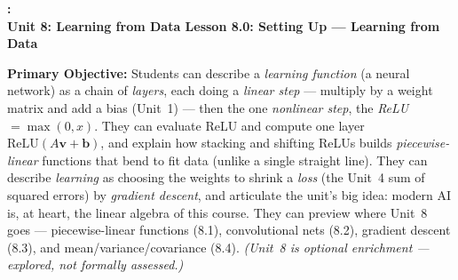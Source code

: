 \documentclass[10pt]{article}
\newcommand{\vv}{\mathbf{v}}
\newcommand{\bb}{\mathbf{b}}
\newcommand{\relu}{\mathrm{ReLU}}
\newcommand{\UnitNumberName}{Unit 8: Learning from Data \quad}
\newcommand{\LessonNumberName}{Lesson 8.0: Setting Up --- Learning from Data}
\begin{document}
\begin{center}
    {\Large\bfseries \CourseName: \SchoolYear \\
    {\small\bfseries \UnitNumberName \LessonNumberName}}
\end{center}

\begin{tcolorbox}[colback=blush, colframe=burgundy, boxrule=0.9pt, arc=2mm,
    left=2mm, right=2mm, top=1.5mm, bottom=1.5mm]
    \textbf{Primary Objective:} Students can describe a \emph{learning function} (a neural network) as a
    chain of \emph{layers}, each doing a \emph{linear step} --- multiply by a weight matrix and add a bias
    (Unit~1) --- then the one \emph{nonlinear step}, the \emph{ReLU} $=\max(0,x)$. They can evaluate ReLU
    and compute one layer $\relu(A\vv+\bb)$, and explain how stacking and shifting ReLUs builds
    \emph{piecewise-linear} functions that bend to fit data (unlike a single straight line). They can
    describe \emph{learning} as choosing the weights to shrink a \emph{loss} (the Unit~4 sum of squared
    errors) by \emph{gradient descent}, and articulate the unit's big idea: modern AI is, at heart, the
    linear algebra of this course. They can preview where Unit~8 goes --- piecewise-linear functions (8.1),
    convolutional nets (8.2), gradient descent (8.3), and mean/variance/covariance (8.4).
    \emph{(Unit~8 is optional enrichment --- explored, not formally assessed.)}
\end{tcolorbox}
\end{document}
